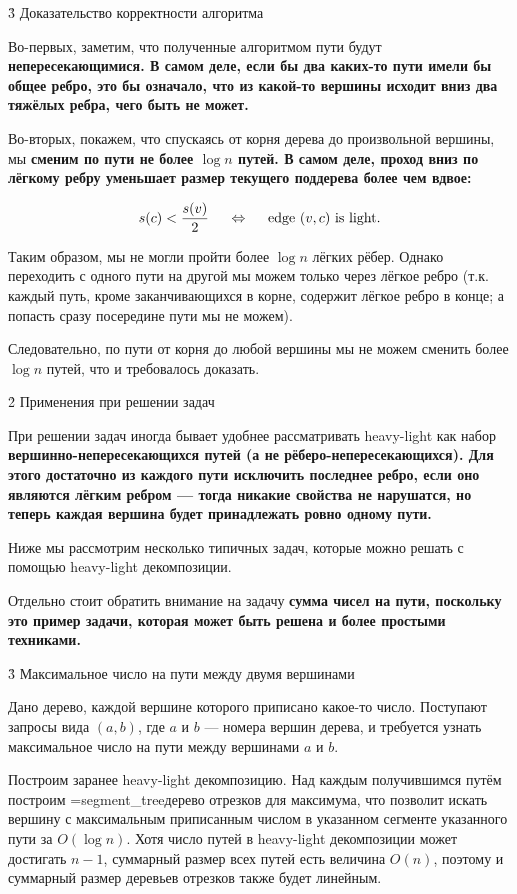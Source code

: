 \h3{ Доказательство корректности алгоритма }

Во-первых, заметим, что полученные алгоритмом пути будут \bf{непересекающимися}. В самом деле, если бы два каких-то пути имели бы общее ребро, это бы означало, что из какой-то вершины исходит вниз два тяжёлых ребра, чего быть не может.

Во-вторых, покажем, что спускаясь от корня дерева до произвольной вершины, мы \bf{сменим по пути не более $\log n$ путей}. В самом деле, проход вниз по лёгкому ребру уменьшает размер текущего поддерева более чем вдвое:

$$ s(c) < \frac{ s(v) }{ 2 } ~~~~ \Leftrightarrow ~~~~ {\rm edge} ~ (v,c) ~ {\rm is ~ light}. $$

Таким образом, мы не могли пройти более $\log n$ лёгких рёбер. Однако переходить с одного пути на другой мы можем только через лёгкое ребро (т.к. каждый путь, кроме заканчивающихся в корне, содержит лёгкое ребро в конце; а попасть сразу посередине пути мы не можем).

Следовательно, по пути от корня до любой вершины мы не можем сменить более $\log n$ путей, что и требовалось доказать.


\h2{ Применения при решении задач }

При решении задач иногда бывает удобнее рассматривать heavy-light как набор \bf{вершинно-непересекающихся} путей (а не рёберо-непересекающихся). Для этого достаточно из каждого пути исключить последнее ребро, если оно являются лёгким ребром --- тогда никакие свойства не нарушатся, но теперь каждая вершина будет принадлежать ровно одному пути.

Ниже мы рассмотрим несколько типичных задач, которые можно решать с помощью heavy-light декомпозиции.

Отдельно стоит обратить внимание на задачу \bf{сумма чисел на пути}, поскольку это пример задачи, которая может быть решена и более простыми техниками.


\h3{ Максимальное число на пути между двумя вершинами }

Дано дерево, каждой вершине которого приписано какое-то число. Поступают запросы вида $(a,b)$, где $a$ и $b$ --- номера вершин дерева, и требуется узнать максимальное число на пути между вершинами $a$ и $b$.

Построим заранее heavy-light декомпозицию. Над каждым получившимся путём построим \algohref=segment_tree{дерево отрезков для максимума}, что позволит искать вершину с максимальным приписанным числом в указанном сегменте указанного пути за $O (\log n)$. Хотя число путей в heavy-light декомпозиции может достигать $n-1$, суммарный размер всех путей есть величина $O(n)$, поэтому и суммарный размер деревьев отрезков также будет линейным.

